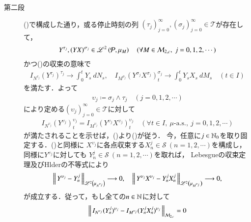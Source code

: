 \begin{prf}
\begin{description}
			\item[第二段]
				()で構成した通り，或る停止時刻の列
				$(\tau_j)_{j=0}^{\infty},(\sigma_j)_{j=0}^{\infty} \in \mathcal{T}$が存在して，
				\begin{align}
					Y^{\tau_j},(YX)^{\sigma_j} \in \semiLp{2}{\mathcal{P},\mu_{M}}
					\quad (\forall M \in \mathcal{M}_{2,c},\ j=0,1,2,\cdots)
				\end{align}
				かつ()の収束の意味で
				\begin{align}
					I_{N^{\tau_j}}(Y^{\tau_j})^{\tau_j} \longrightarrow \int_0^t Y_s\ dN_s,
					\quad 
					I_{M^{\sigma_j}}(Y^{\sigma_j}X^{\sigma_j})^{\sigma_j}_t \longrightarrow \int_0^t Y_s X_s\ dM_s
					\quad (t \in I)
					\label{eq:Ito-Integral_on_M_c_loc_report_7_1}
				\end{align}
				を満たす．よって
				\begin{align}
					\upsilon_j \coloneqq \sigma_j \wedge \tau_j 
					\quad (j=0,1,2,\cdots)
				\end{align}
				により定める$(\upsilon_j)_{j=0}^{\infty} \in \mathcal{T}$に対して
				\begin{align}
					I_{N^{\upsilon_j}} (Y^{\upsilon_j})^{\upsilon_j}_t
					= I_{M^{\upsilon_j}} (Y^{\upsilon_j}X^{\upsilon_j})^{\upsilon_j}_t
					\quad (\forall t \in I,\ \mbox{$\mu$-a.s.},\ j=0,1,2,\cdots)
					\label{eq:Ito-Integral_on_M_c_loc_report_7_2}
				\end{align}
				が満たされることを示せば，()より()が従う．
				今，任意に$j \in \mathbb{N}_0$を取り固定する．()と同様に
				$X^{\upsilon_j}$に各点収束する$X^j_n \in \mathcal{S}\ (n=1,2,\cdots)$を構成し，同様に$Y^{\upsilon_j}$に対しても
				$Y^j_n \in \mathcal{S}\ (n=1,2,\cdots)$を取れば，
				Lebesgueの収束定理及びHlderの不等式により
				\begin{align}
					\left\|\, Y^{\upsilon_j} - Y^j_n\, \right\|_{\mathscr{L}^{2} \left(\mu_{N^{\upsilon_j}}\right)} \longrightarrow 0, 
					\quad \left\|\, Y^{\upsilon_j}X^{\upsilon_j} - Y^j_n X^j_n\, \right\|_{\mathscr{L}^{2} \left(\mu_{M^{\upsilon_j}}\right)} \longrightarrow 0, 
				\end{align}
				が成立する．従って，もし全ての$n \in \mathbb{N}$に対して
				\begin{align}
					\Norm{I_{N^{\upsilon_j}} (Y_n^j)^{\upsilon_j} - I_{M^{\upsilon_j}} (Y^j_n X^j_n)^{\upsilon_j}}{\mathcal{M}_{2,c}}
					= 0
					\label{eq:Ito-Integral_on_M_c_loc_report_7_3}

\end{align}
\end{description}
\end{prf}
